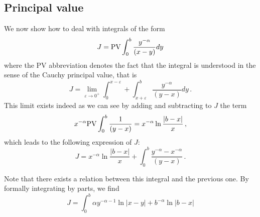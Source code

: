 \documentclass[french]{article}
\begin{document}
\subsection{Principal value}

We now show how to deal with integrals of the form 
\[J = \textup{PV}\int_{0}^b \frac{y^{-\alpha}}{(x - y)}dy\]
where the PV abbreviation denotes the fact that the integral is understood in the sense of the Cauchy principal value, that is
\[J = \lim_{\varepsilon \to 0^+} \int_{0}^{x - \varepsilon} + \int_{x + \varepsilon}^b \frac{y^{-\alpha}}{(y-x)}dy\,.\]
This limit exists indeed as we can see by adding and subtracting to $J$ the term
\[x^{-\alpha} \textup{PV}\int_{0}^b \frac{1}{(y-x)} = x^{-\alpha} \ln \frac{|b-x|}{x}\,,\]
which leads to the following expression of $J$:
\[J = x^{-\alpha} \ln \frac{|b-x|}{x} + \int_{0}^b \frac{y^{-\alpha} - x^{-\alpha}}{(y-x)}\,.\]

Note that there exists a relation between this integral and the previous one. 
By formally integrating by parts, we find
\[J = \int_{0}^b \alpha y^{- \alpha-1} \ln |x-y| + b^{-\alpha}\ln|b - x|\]
\end{document}
